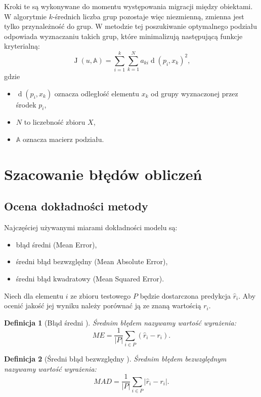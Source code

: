 \documentclass[12pt,a4paper]{report}
\newtheorem{df}{Definicja}[chapter]
\newcommand{\J}[2]{\operatorname{J}\left({#1}, {#2} \right)}
\newcommand{\distance}[2]{\operatorname{d}\left({#1}, {#2} \right)}
\begin{document}
Kroki te są wykonywane do momentu występowania migracji między obiektami.
W algorytmie $k$-średnich liczba grup pozostaje więc niezmienną, zmienna jest tylko przynależność do grup.
W metodzie tej poszukiwanie optymalnego podziału odpowiada wyznaczaniu takich grup, które minimalizują następującą funkcje kryterialną:
$$
\J{u}{\mathbb{A}} = \sum_{i=1}^k \sum_{k=1}^N a_{ki}\distance{p_i}{x_k}^2,
$$
gdzie 
\begin{itemize}
\item $\distance{p_i}{x_k}$ oznacza odległość elementu $x_k$ od grupy wyznaczonej przez środek $p_i$,
\item $N$ to liczebność zbioru $\mathit{X}$,
\item $\mathbb{A}$ oznacza macierz podziału.
\end{itemize}
 
\section{Szacowanie błędów obliczeń}
\subsection{Ocena dokładności metody}%
Najczęściej używanymi miarami dokładności modelu są:
\begin{itemize}
\item błąd średni (Mean Error),
\item średni błąd bezwzględny (Mean Absolute Error),
\item średni błąd kwadratowy (Mean Squared Error).
\end{itemize}

Niech dla elementu $i$ ze zbioru testowego $\mathit{P}$ będzie dostarczona predykcja $\widehat{r}_i$. Aby ocenić jakość jej wyniku należy porównać ją ze znaną wartością $r_i$.

\begin{df}[Błąd średni {\citep[Sec 4.1.1]{rsh}}]
Średnim błędem nazywamy wartość wyrażenia:
$$
ME = \frac{1}{|\mathit{P}|}\sum_{i\in \mathit{P}}(\widehat{r}_i-r_i).
$$
\end{df}

\begin{df}[Średni błąd bezwzględny  {\citep[Sec 4.1.1]{rsh}}]
Średnim błędem bezwzględnym nazywamy wartość wyrażenia:
$$
MAD = \frac{1}{|\mathit{P}|}\sum_{i\in \mathit{P}}|\widehat{r}_i-r_i|.
$$
\end{df}
\end{document}
